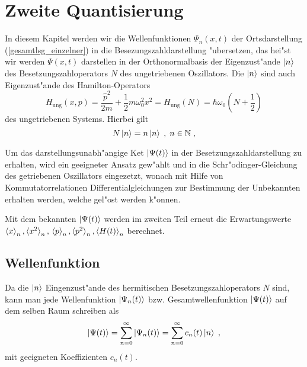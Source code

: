 \chapter{Zweite Quantisierung}
In diesem Kapitel werden wir die Wellenfunktionen $\Psi_n(x,t)$ der Ortsdarstellung (\ref{gesamtlsg_einzelner}) in die Besezungszahldarstellung "ubersetzen, das hei"st wir werden $\Psi(x,t)$ darstellen in der Orthonormalbasis der Eigenzust"ande $\ket{n}$ des Besetzungszahloperators $N$ des ungetriebenen Oszillators.
Die $\ket{n}$ sind auch Eigenzust"ande des Hamilton-Operators
\begin{equation}
   H_\text{ung}(x,p) = \frac{\hat p^2}{2m} + \frac 1 2 m\omega_0^2 x^2 = H_{\text{ung}}(N)= \hbar\omega_0\left(N+\frac 1 2\right)
\end{equation}
des ungetriebenen Systems.
Hierbei gilt
\begin{equation}
   N \ket{n} = n \ket{n} \;,\; n\in \mathbb{N} \;,
\end{equation}
\iffalse
\begin{equation}
  H=\frac{\hat p^2}{2m} + \frac 1 2 m\omega_0^2\hat x^2 = \hbar\eft(\hat n+\frac 1 2\right)
\end{equation}
\fi
Um das darstellungsunabh"angige Ket $\ket{\Psi(t)}$ in der Besetzungszahldarstellung zu erhalten, wird ein geeigneter Ansatz gew"ahlt und in die Schr"odinger-Gleichung des getriebenen Oszillators eingezetzt, wonach mit Hilfe von Kommutatorrelationen Differentialgleichungen zur Bestimmung der Unbekannten erhalten werden, welche gel"ost werden k"onnen.

Mit dem bekannten $\ket{\Psi(t)}$ werden im zweiten Teil erneut die Erwartungswerte $\braket{x}_n,\braket{x^2}_n, \\ \braket{p}_n,\braket{p^2}_n,\braket{H(t)}_n$ berechnet.


\section{Wellenfunktion}
  Da die $\ket{n}$ Eingenzust"ande des hermitischen Besetzungszahloperators $N$ sind, kann man jede Wellenfunktion $\ket{\Psi_n(t)}$ bzw. Gesamtwellenfunktion $\ket{\Psi(t)}$ auf dem selben Raum schreiben als
  \begin{equation}
    \ket{\Psi(t)}=\sum_{n=0}^{\infty}\ket{\Psi_n(t)}=\sum_{n=0}^{\infty}c_n(t)\ket{n} \;,
  \end{equation}
  mit geeigneten Koeffizienten $c_n(t)$.

